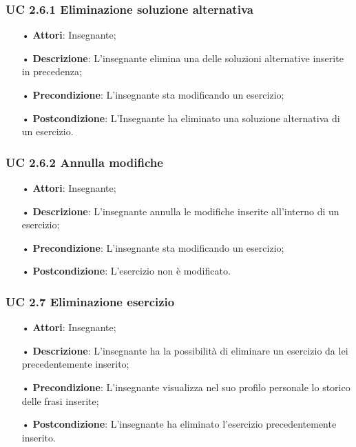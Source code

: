 \subsubsection{UC 2.6.1 Eliminazione soluzione alternativa}
\begin{itemize}
	\item[•] \textbf{Attori}: Insegnante;
	\item[•] \textbf{Descrizione}: L'insegnante elimina una delle soluzioni alternative inserite in precedenza;
	\item[•] \textbf{Precondizione}: L'insegnante sta modificando un esercizio;
	\item[•] \textbf{Postcondizione}: L'Insegnante ha eliminato una soluzione alternativa di un esercizio.
\end{itemize}

\subsubsection{UC 2.6.2 Annulla modifiche}
\begin{itemize}
	\item[•] \textbf{Attori}: Insegnante;
	\item[•] \textbf{Descrizione}: L'insegnante annulla le modifiche inserite all'interno di un esercizio; 
	\item[•] \textbf{Precondizione}: L'insegnante sta modificando un esercizio;
	\item[•] \textbf{Postcondizione}: L'esercizio non è modificato.
\end{itemize}


 
\subsubsection{UC 2.7 Eliminazione esercizio}
\begin{itemize}
	\item[•] \textbf{Attori}: Insegnante;
	\item[•] \textbf{Descrizione}: L'insegnante ha la possibilità di eliminare un esercizio da lei precedentemente inserito;
	\item[•] \textbf{Precondizione}: L'insegnante visualizza nel suo profilo personale lo storico delle frasi inserite;
	\item[•] \textbf{Postcondizione}: L'insegnante ha eliminato l'esercizio precedentemente inserito.
\end{itemize}